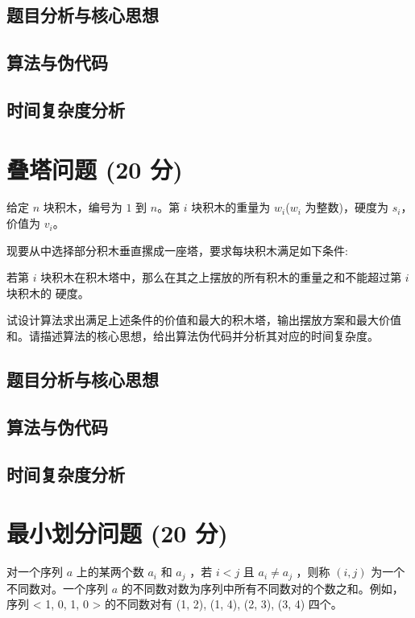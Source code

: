 \documentclass{article}
\begin{document}
\subsection{题目分析与核心思想}

\subsection{算法与伪代码}

\subsection{时间复杂度分析}


\section{叠塔问题 (20 分)}

给定 $n$ 块积木，编号为 $1$ 到 $n$。第 $i$ 块积木的重量为 $w_i$($w_i$ 为整数)，硬度为 $s_i$，价值为 $v_i$。   

现要从中选择部分积木垂直摞成一座塔，要求每块积木满足如下条件:

若第 $i$ 块积木在积木塔中，那么在其之上摆放的所有积木的重量之和不能超过第 $i$ 块积木的
硬度。

试设计算法求出满足上述条件的价值和最大的积木塔，输出摆放方案和最大价值和。请描述算法的核心思想，给出算法伪代码并分析其对应的时间复杂度。

\subsection{题目分析与核心思想}

\subsection{算法与伪代码}

\subsection{时间复杂度分析}


\section{最小划分问题 (20 分)}

对一个序列 $a$ 上的某两个数 $a_i$ 和 $a_j$ ，若 $i < j$ 且 $a_i \ne a_j$ ，则称 $(i, j)$ 为一个不同数对。一个序列 $a$ 的不同数对数为序列中所有不同数对的个数之和。例如，序列 < 1, 0, 1, 0 > 的不同数对有 (1, 2), (1, 4), (2, 3), (3, 4) 四个。
\end{document}
